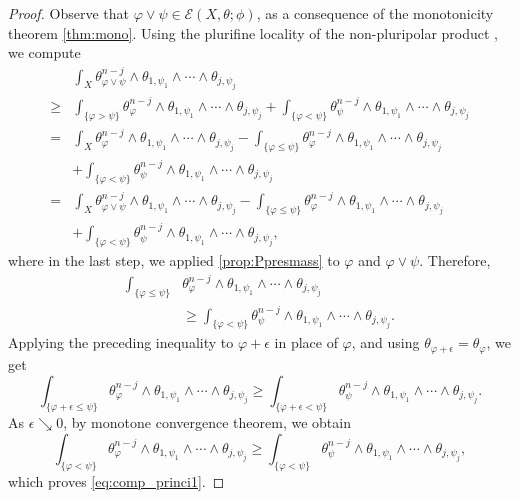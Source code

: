 \begin{proof}
    Observe that $\varphi\lor \psi\in \mathcal{E}(X,\theta;\phi)$, as a consequence of the monotonicity theorem \cref{thm:mono}.
    Using the plurifine locality of the non-pluripolar product , we compute
    \[
    \begin{aligned}
    &\int_X \theta_{\varphi\lor \psi}^{n-j}\wedge \theta_{1,\psi_1}\wedge \cdots \wedge \theta_{j,\psi_j}\\
    \geq & \int_{\{\varphi>\psi\} } \theta_{\varphi}^{n-j}\wedge \theta_{1,\psi_1}\wedge \cdots \wedge \theta_{j,\psi_j}+\int_{\{\varphi<\psi\} } \theta_{\psi}^{n-j}\wedge \theta_{1,\psi_1}\wedge \cdots \wedge \theta_{j,\psi_j}\\
    =& \int_X  \theta_{\varphi}^{n-j}\wedge \theta_{1,\psi_1}\wedge \cdots \wedge \theta_{j,\psi_j}-\int_{\{\varphi\leq \psi\} } \theta_{\varphi}^{n-j}\wedge \theta_{1,\psi_1}\wedge \cdots \wedge \theta_{j,\psi_j}\\
    &+\int_{\{\varphi<\psi\} } \theta_{\psi}^{n-j}\wedge \theta_{1,\psi_1}\wedge \cdots \wedge \theta_{j,\psi_j}\\
    =&\int_X  \theta_{\varphi\lor \psi}^{n-j}\wedge \theta_{1,\psi_1}\wedge \cdots \wedge \theta_{j,\psi_j}-\int_{\{\varphi\leq \psi\} } \theta_{\varphi}^{n-j}\wedge \theta_{1,\psi_1}\wedge \cdots \wedge \theta_{j,\psi_j}\\
    &+\int_{\{\varphi<\psi\} } \theta_{\psi}^{n-j}\wedge \theta_{1,\psi_1}\wedge \cdots \wedge \theta_{j,\psi_j},
    \end{aligned}
    \]
    where in the last step, we applied \cref{prop:Ppresmass} to $\varphi$ and $\varphi\lor \psi$. Therefore,
    \[
    \begin{aligned}
    \int_{\{\varphi\leq \psi\}}& \theta_{\varphi}^{n-j} \wedge \theta_{1,\psi_1}\wedge \cdots \wedge \theta_{j,\psi_j}\\
    &\geq \int_{\{\varphi<\psi\}} \theta_{\psi}^{n-j} \wedge \theta_{1,\psi_1}\wedge \cdots \wedge \theta_{j,\psi_j}.
    \end{aligned}
    \]
    Applying the preceding inequality to $\varphi+\epsilon$ in place of $\varphi$, and using $\theta_{\varphi+\epsilon}=\theta_\varphi$, we get
    \[
        \int_{\{\varphi+\epsilon\leq\psi\}}\theta_\varphi^{n-j}\wedge \theta_{1,\psi_1}\wedge\cdots\wedge\theta_{j,\psi_j} \geq \int_{\{\varphi+\epsilon<\psi\}}\theta_\psi^{n-j}\wedge \theta_{1,\psi_1}\wedge\cdots\wedge\theta_{j,\psi_j}.
    \]
    As $\epsilon\searrow 0$, by monotone convergence theorem, we obtain
    \[
    \int_{\{\varphi<\psi\}}\theta_\varphi^{n-j}\wedge \theta_{1,\psi_1}\wedge\cdots\wedge\theta_{j,\psi_j} \geq \int_{\{\varphi<\psi\}}\theta_\psi^{n-j}\wedge \theta_{1,\psi_1}\wedge\cdots\wedge\theta_{j,\psi_j},
    \]
    which proves \eqref{eq:comp_princi1}.


\end{proof}
